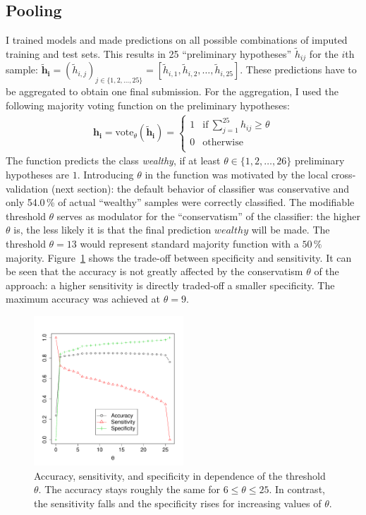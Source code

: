 \documentclass[a4paper]{article}
\begin{document}
\subsection{Pooling}
\label{sec:pooling}

I trained models and made predictions on all possible combinations of
imputed training and test sets. This results in 25 ``preliminary
hypotheses'' $\tilde{h}_{ij}$ for the $i$th sample:
$\mathbf{\tilde{h}_i} = (\tilde{h}_{i,j})_{j \in \{1, 2, \ldots, 25\}} = [\tilde{h}_{i,1}, \tilde{h}_{i,2}, \ldots, \tilde{h}_{i,25}]$. These
predictions have to be aggregated to obtain one final submission. For
the aggregation, I used the following majority voting function on the
preliminary hypotheses:
\begin{align}
\mathbf{h_i} = \text{vote}_\theta(\mathbf{\tilde{h}_i}) =
\begin{cases}
1 & \text{if}~\sum_{j = 1}^{25} h_{ij} \geq \theta\\
0 & \text{otherwise }\\
\end{cases}
\end{align}
The function predicts the class \emph{wealthy}, if at least
$\theta \in \{1, 2, \ldots, 26\}$ preliminary hypotheses are
$1$. Introducing $\theta$ in the function was motivated by the local
cross-validation (next section): the default behavior of classifier
was conservative and only 54.0\,\% of actual ``wealthy'' samples were
correctly classified. The modifiable threshold $\theta$ serves as
modulator for the ``conservatism'' of the classifier: the higher
$\theta$ is, the less likely it is that the final prediction $wealthy$
will be made. The threshold $\theta = 13$ would represent standard
majority function with a $50\,\%$ majority.  Figure~\ref{fig:tuning}
shows the trade-off between specificity and sensitivity. It can be
seen that the accuracy is not greatly affected by the conservatism
$\theta$ of
the approach: a higher sensitivity is directly traded-off a
smaller specificity. The maximum accuracy was achieved at
$\theta = 9$.

\begin{figure}[h]
  \centering
  \includegraphics[width=0.5\textwidth]{../Python/theta}
  \caption{Accuracy, sensitivity, and specificity in dependence of the
    threshold $\theta$. The accuracy stays roughly the same for
    $6 \leq \theta \leq 25$. In contrast, the sensitivity falls and
    the specificity rises for increasing values of $\theta$.}
  \label{fig:tuning}
\end{figure}
\end{document}
